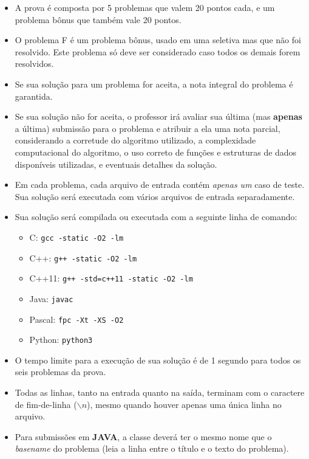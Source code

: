\documentclass[12pt,oneside]{article} %
\begin{document}
\begin{itemize}

    \item A prova é composta por 5 problemas que valem 20 pontos cada, e um
    problema bônus que também vale 20 pontos.

    \item O problema F é um problema bônus, usado em uma seletiva mas que não foi resolvido.
    Este problema só deve ser considerado caso todos os demais forem resolvidos.

    \item Se sua solução para um problema for aceita, a nota integral
    do problema é garantida.

    \item Se sua solução não for aceita, o professor irá avaliar sua última (mas
            \textbf{apenas} a última) submissão para o problema e atribuir a ela uma
    nota parcial, considerando a corretude do algoritmo utilizado, a
    complexidade computacional do algoritmo, o uso correto de funções e estruturas de dados
    disponíveis utilizadas, e eventuais detalhes da solução.

    \item Em cada problema, cada arquivo de entrada contém \textit{apenas um} caso de
    teste. Sua solução será executada com vários arquivos de entrada
    separadamente.

    \item Sua solução será compilada ou executada com a seguinte linha de comando:
    \begin{itemize}
        \item C: \verb|gcc -static -O2 -lm|
        \item C++: \verb|g++ -static -O2 -lm|
        \item C++11: \verb|g++ -std=c++11 -static -O2 -lm|
        \item Java: \verb|javac|
        \item Pascal: \verb|fpc -Xt -XS -O2|
        \item Python: \verb|python3|
    \end{itemize}

    \item O tempo limite para a execução de sua solução é de 1 segundo para
    todos os seis problemas da prova.

    \item Todas as linhas, tanto na entrada quanto na saída, terminam com o
    caractere de fim-de-linha ($\backslash n$), mesmo quando houver apenas uma única
    linha no arquivo.

    \item Para submissões em \textbf{JAVA}, a classe deverá ter o mesmo nome que
    o \textit{basename} do problema (leia a linha entre o título e o texto do
    problema).

\end{itemize}
\end{document}

